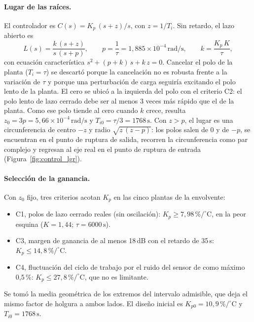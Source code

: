 \paragraph{Lugar de las raíces.} El controlador es $C(s) = K_p\,(s + z)/s$, con $z = 1/T_i$. Sin retardo, el lazo abierto es
\begin{equation}
L(s) = \frac{k\,(s + z)}{s\,(s + p)}, \qquad p = \frac{1}{\tau} = 1{,}885 \times 10^{-4}\,\mathrm{rad/s}, \qquad k = \frac{K_p\,K}{\tau},
\label{eq:lazo_pi}
\end{equation}
con ecuación característica $s^2 + (p + k)\,s + k\,z = 0$. Cancelar el polo de la planta ($T_i = \tau$) se descartó porque la cancelación no es robusta frente a la variación de $\tau$ y porque una perturbación de carga seguiría excitando el polo lento de la planta. El cero se ubicó a la izquierda del polo con el criterio C2: el polo lento de lazo cerrado debe ser al menos 3 veces más rápido que el de la planta. Como ese polo tiende al cero cuando $k$ crece, resulta $z_0 = 3p = 5{,}66 \times 10^{-4}\,\mathrm{rad/s}$ y $T_{i0} = \tau/3 = 1768\,\mathrm{s}$. Con $z > p$, el lugar es una circunferencia de centro $-z$ y radio $\sqrt{z\,(z - p)}$: los polos salen de 0 y de $-p$, se encuentran en el punto de ruptura de salida, recorren la circunferencia como par complejo y regresan al eje real en el punto de ruptura de entrada (Figura~\ref{fig:control_lgr}).

\paragraph{Selección de la ganancia.} Con $z_0$ fijo, tres criterios acotan $K_p$ en las cinco plantas de la envolvente:
\begin{itemize}
\item C1, polos de lazo cerrado reales (sin oscilación): $K_p \geq 7{,}98\,\%/^{\circ}\mathrm{C}$, en la peor esquina ($K = 1{,}44$; $\tau = 6000\,\mathrm{s}$).
\item C3, margen de ganancia de al menos 18\,dB con el retardo de 35\,s: $K_p \leq 14{,}8\,\%/^{\circ}\mathrm{C}$.
\item C4, fluctuación del ciclo de trabajo por el ruido del sensor de como máximo 0,5\,\%: $K_p \leq 27{,}8\,\%/^{\circ}\mathrm{C}$, que no es limitante.
\end{itemize}
Se tomó la media geométrica de los extremos del intervalo admisible, que deja el mismo factor de holgura a ambos lados. El diseño inicial es $K_{p0} = 10{,}9\,\%/^{\circ}\mathrm{C}$ y $T_{i0} = 1768\,\mathrm{s}$.

